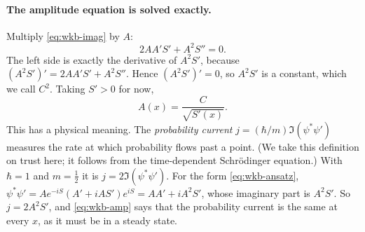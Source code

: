 \paragraph{The amplitude equation is solved exactly.} Multiply \cref{eq:wkb-imag} by $A$:
\begin{equation}
2AA'S'+A^2S''=0.
\end{equation}
The left side is exactly the derivative of $A^2S'$, because $(A^2S')'=2AA'S'+A^2S''$. Hence $(A^2S')'=0$, so $A^2S'$ is a constant, which we call $C^2$. Taking $S'>0$ for now,
\begin{equation}
A(x)=\frac{C}{\sqrt{S'(x)}}.
\label{eq:wkb-amp}
\end{equation}
This has a physical meaning. The \emph{probability current} $j=(\hbar/m)\Im(\psi^*\psi')$ measures the rate at which probability flows past a point. (We take this definition on trust here; it follows from the time-dependent Schr\"odinger equation.) With $\hbar=1$ and $m=\tfrac12$ it is $j=2\Im(\psi^*\psi')$. For the form \cref{eq:wkb-ansatz}, $\psi^*\psi'=Ae^{-iS}(A'+iAS')e^{iS}=AA'+iA^2S'$, whose imaginary part is $A^2S'$. So $j=2A^2S'$, and \cref{eq:wkb-amp} says that the probability current is the same at every $x$, as it must be in a steady state.

